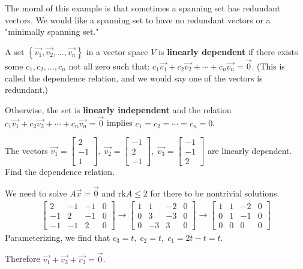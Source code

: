 \documentclass[../main.tex]{subfiles}
\begin{document}
The moral of this example is that sometimes a spanning set has redundant vectors.
We would like a spanning set to have no redundant vectors or a "minimally spanning set."

\begin{definition}
    A set \( \left\{ \vec{v_1}, \vec{v_2}, \dots, \vec{v_n} \right\} \) in a vector space \( V \) is \textbf{linearly dependent}
    if there exists some \( c_1, c_2, \dots, c_n \) not all zero such that:
    \( c_1\vec{v_1} + c_2\vec{v_2} + \cdots + c_n\vec{v_n} = \vec{0} \).
    (This is called the dependence relation, and we would say one of the vectors is redundant.)

    Otherwise, the set is \textbf{linearly independent} and the relation \( c_1\vec{v_1} + c_2\vec{v_2} + \cdots + c_n\vec{v_n} = \vec{0} \)
    implies \( c_1 = c_2 = \cdots = c_n = 0\).
\end{definition}

\begin{example}[]
    The vectors \(\vec{v_1} = \begin{bmatrix} 2 \\ -1 \\ 1 \end{bmatrix},
    \; \vec{v_2} = \begin{bmatrix} -1 \\ 2 \\ -1 \end{bmatrix},
    \; \vec{v_3} = \begin{bmatrix} -1 \\ -1 \\ 2 \end{bmatrix} \) are linearly dependent. \\
    Find the dependence relation.

    We need to solve \( A\vec{x} = \vec{0} \) and \( \text{rk}A \leq 2 \) for there to be nontrivial solutions.
    \begin{gather*}
        \begin{bmatrix}
            2 & -1 & -1 & 0 \\
            -1 & 2 & -1 & 0 \\
            -1 & -1 & 2 & 0
        \end{bmatrix}
        \rightarrow
        \begin{bmatrix}
            1 & 1 & -2 & 0 \\
            0 & 3 & -3 & 0 \\
            0 & -3 & 3 & 0
        \end{bmatrix}
        \rightarrow
        \begin{bmatrix}
            1 & 1 & -2 & 0 \\
            0 & 1 & -1 & 0 \\
            0 & 0 & 0 & 0
        \end{bmatrix}
    \end{gather*}
    Parameterizing, we find that \( c_3 = t, \; c_2 = t, \; c_1 = 2t-t = t \).

    Therefore \( \boxed{\vec{v_1}+\vec{v_2}+\vec{v_3} = \vec{0}} \).
\end{example}
\end{document}
